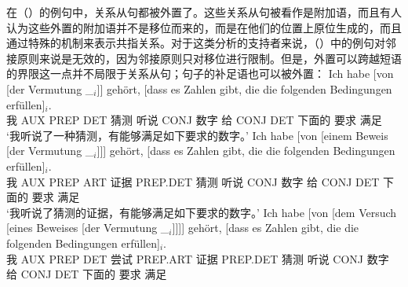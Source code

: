 \largerpage[-1]
在（）的例句中，关系从句都被外置了。这些关系从句被看作是附加语，而且有人认为这些外置的附加语并不是移位而来的，而是在他们的位置上原位生成的，而且通过特殊的机制来表示共指关系\citep{Kiss2005a}。对于这类分析的支持者来说，（）中的例句对邻接原则来说是无效的，因为邻接原则只对移位进行限制。但是，外置可以跨越短语的界限这一点并不局限于关系从句；句子的补足语也可以被外置：
\eal
\ex 
\gll Ich habe [von [der Vermutung \_$_i$]] gehört, [dass es Zahlen gibt, die die folgenden Bedingungen erfüllen]$_i$.\\
	 我 AUX \spacebr{}PREP \spacebr{}DET 猜测 {} 听说 \spacebr{}CONJ \expl{} 数字 给 CONJ DET 下面的 要求 满足\\
\glt `我听说了一种猜测，有能够满足如下要求的数字。'
\ex 
\gll Ich habe [von [einem Beweis [der Vermutung \_$_i$]]] gehört, [dass es Zahlen gibt, die die folgenden Bedingungen erfüllen]$_i$.\\
	我 AUX \spacebr{}PREP \spacebr{}ART 证据 \spacebr{}PREP.DET 猜测 {} 听说 \spacebr{}CONJ \expl{} 数字 给 CONJ DET 下面的 要求 满足\\
\glt `我听说了猜测的证据，有能够满足如下要求的数字。'
\ex 
\gll Ich habe [von [dem Versuch [eines Beweises [der Vermutung \_$_i$]]]] gehört, [dass es Zahlen gibt, die die folgenden Bedingungen erfüllen]$_i$.\\
     我 AUX \spacebr{}PREP \spacebr{}DET 尝试 \spacebr{}PREP.ART 证据 \spacebr{}PREP.DET 猜测 {} 听说 \spacebr{}CONJ \expl{} 数字 给 CONJ DET 下面的 要求 满足\\
